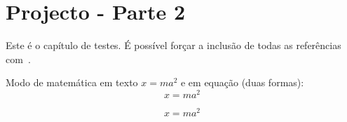 \chapter{Projecto - Parte 2}\label{ch:projeto-parte2}

Este é o capítulo de testes.
É possível forçar a inclusão de todas as referências com~\cite{*}.

Modo de matemática em texto $x = ma^2$ e em equação (duas formas):
\[
    x = ma^2
\]

\begin{equation}
    x = ma^2
\end{equation}
